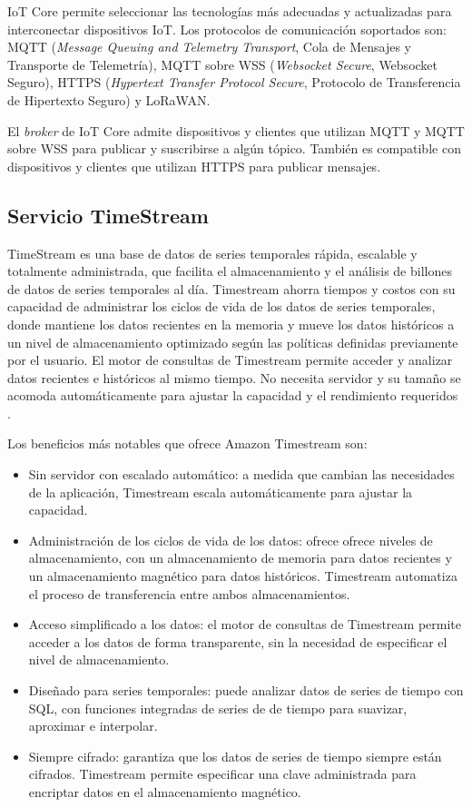 IoT Core permite seleccionar las tecnologías más adecuadas y actualizadas para interconectar dispositivos IoT. Los protocolos de comunicación soportados son: MQTT (\textit{Message Queuing and Telemetry Transport}, Cola de Mensajes y Transporte de Telemetría), MQTT sobre WSS (\textit{Websocket Secure}, Websocket Seguro), HTTPS (\textit{Hypertext Transfer Protocol Secure}, Protocolo de Transferencia de Hipertexto Seguro) y LoRaWAN.

El \textit{broker} de IoT Core admite dispositivos y clientes que utilizan MQTT y MQTT sobre WSS para publicar y suscribirse a algún tópico. También es compatible con dispositivos y clientes que utilizan HTTPS para publicar mensajes.

\subsection{Servicio TimeStream}
TimeStream es una base de datos de series temporales rápida, escalable y totalmente administrada, que facilita el almacenamiento y el análisis de billones de datos de series temporales al día. Timestream ahorra tiempos y costos con su capacidad de administrar los ciclos de vida de los datos de series temporales, donde mantiene los datos recientes en la memoria y mueve los datos históricos a un nivel de almacenamiento optimizado según las políticas definidas previamente por el usuario. El motor de consultas de Timestream permite acceder y analizar datos recientes e históricos al mismo tiempo. No necesita servidor y su tamaño se acomoda automáticamente para ajustar la capacidad y el rendimiento requeridos \cite{timestream_info}.

Los beneficios más notables que ofrece Amazon Timestream son:
\begin{itemize}
	\item Sin servidor con escalado automático: a medida que cambian las necesidades de la aplicación, Timestream escala automáticamente para ajustar la capacidad.
	\item Administración de los ciclos de vida de los datos: ofrece ofrece niveles de almacenamiento, con un almacenamiento de memoria para datos recientes y un almacenamiento magnético para datos históricos. Timestream automatiza el proceso de transferencia entre ambos almacenamientos.
	\item Acceso simplificado a los datos: el motor de consultas de Timestream permite acceder a los datos de forma transparente, sin la necesidad de especificar el nivel de almacenamiento.
	\item Diseñado para series temporales: puede analizar datos de series de tiempo con SQL, con funciones integradas de series de de tiempo para suavizar, aproximar e interpolar.
	\item Siempre cifrado: garantiza que los datos de series de tiempo siempre están cifrados. Timestream permite especificar una clave administrada para encriptar datos en el almacenamiento magnético.
	
\end{itemize}

